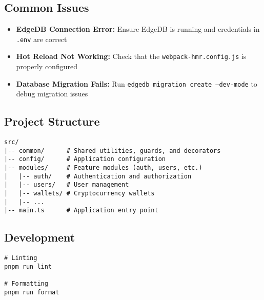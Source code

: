 \subsection*{Common Issues}
\begin{itemize}
    \item \textbf{EdgeDB Connection Error:} Ensure EdgeDB is running and credentials in \colorbox{yellow!30}{\texttt{.env}} are correct
    \item \textbf{Hot Reload Not Working:} Check that the \colorbox{yellow!30}{\texttt{webpack-hmr.config.js}} is properly configured
    \item \textbf{Database Migration Fails:} Run \colorbox{yellow!30}{\texttt{edgedb migration create --dev-mode}} to debug migration issues
\end{itemize}
\subsection*{Project Structure}
\begin{tcolorbox}[width=\textwidth, boxrule=0pt, colback=gray!5, colframe=gray!5, arc=0mm, outer arc=0mm]
\begin{lstlisting}[numbers=none]
src/
|-- common/      # Shared utilities, guards, and decorators
|-- config/      # Application configuration
|-- modules/     # Feature modules (auth, users, etc.)
|   |-- auth/    # Authentication and authorization
|   |-- users/   # User management
|   |-- wallets/ # Cryptocurrency wallets
|   |-- ...
|-- main.ts      # Application entry point
\end{lstlisting}
\end{tcolorbox}
\subsection*{Development}
 \begin{tcolorbox}[width=\textwidth, boxrule=0.5pt, colback=gray!5, colframe=gray!50]
\begin{verbatim}
# Linting
pnpm run lint

# Formatting
pnpm run format
\end{verbatim}
\end{tcolorbox}
